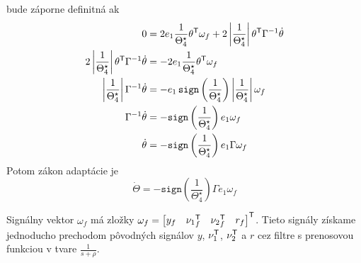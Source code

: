 ﻿\documentclass[a4paper, 10pt, ]{article}
\begin{document}
bude záporne definitná ak
\begin{subequations}
\begin{align}
	0
	&=
	2
	e_1
	\frac{1}{\Theta_4^\star}
	\theta^{\mathsf{T}}
	\omega_f
	+
	2
	\left| \frac{1}{\Theta_4^\star} \right|
	\theta^{\mathsf{T}}
	\Gamma^{-1}
	\dot\theta
	\\
	2
	\left| \frac{1}{\Theta_4^\star} \right|
	\theta^{\mathsf{T}}
	\Gamma^{-1}
	\dot\theta
	&=
	-
	2
	e_1
	\frac{1}{\Theta_4^\star}
	\theta^{\mathsf{T}}
	\omega_f
	\\
	\left| \frac{1}{\Theta_4^\star} \right|
	\Gamma^{-1}
	\dot\theta
	&=
	-
	e_1
	\, \texttt{sign}\left(\frac{1}{\Theta_4^\star}\right)
	\left| \frac{1}{\Theta_4^\star} \right|
	\omega_f
	\\
	\Gamma^{-1}
	\dot\theta
	&=
	-
	\texttt{sign}\left(\frac{1}{\Theta_4^\star}\right)
	e_1
	\omega_f
	\\
	\dot\theta
	&=
	-
	\texttt{sign}\left(\frac{1}{\Theta_4^\star}\right)
	e_1
	\Gamma
	\omega_f
\end{align}
\end{subequations}
Potom zákon adaptácie je
\begin{equation}
	\dot{\Theta}
	=
	-
	\texttt{sign}\left(\frac{1}{\Theta_4^\star}\right)
	\Gamma
	e_1
	\omega_f
\end{equation}

Signálny vektor $\omega_f$ má zložky $\omega_f = \begin{bmatrix} y_f & {\nu_1}_f^{\mathsf{T}} & {\nu_2}_f^{\mathsf{T}} & r_f \end{bmatrix}^{\mathsf{T}}$. Tieto signály získame jednoducho prechodom pôvodných signálov $y$, $\nu_1^{\mathsf{T}}$, $\nu_2^{\mathsf{T}}$ a $r$ cez filtre s prenosovou funkciou v tvare $\frac{1}{s+\rho}$.
\end{document}
